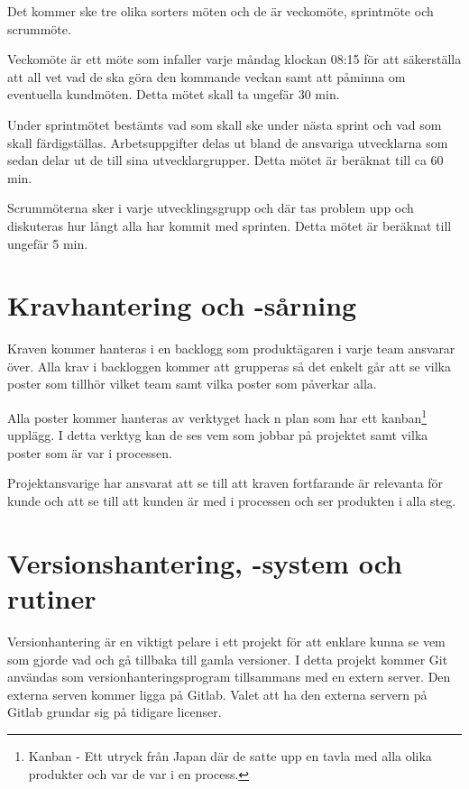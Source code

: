 \documentclass[a4paper,12pt,oneside,final]{extbook}
\begin{document}
Det kommer ske tre olika sorters möten och de är veckomöte, sprintmöte och scrummöte.  

Veckomöte är ett möte som infaller varje måndag klockan 08:15 för att säkerställa att all vet vad de ska göra den kommande veckan samt att påminna om eventuella kundmöten. Detta mötet skall ta ungefär 30 min.

Under sprintmötet bestämts vad som skall ske under nästa sprint och vad som skall färdigställas. Arbetsuppgifter delas ut bland de ansvariga utvecklarna som sedan delar ut de till sina utvecklargrupper. Detta mötet är beräknat till ca 60 min.

Scrummöterna sker i varje utvecklingsgrupp och där tas problem upp och diskuteras hur långt alla har kommit med sprinten.  Detta mötet är beräknat till ungefär 5 min.

\section{Kravhantering och -sårning}
Kraven kommer hanteras i en backlogg som produktägaren i varje team ansvarar över. Alla krav i backloggen kommer att grupperas så det enkelt går att se vilka poster som tillhör vilket team samt vilka poster som påverkar alla. 

Alla poster kommer hanteras av verktyget hack n plan som har ett kanban\footnote{Kanban - Ett utryck från Japan där de satte upp en tavla med alla olika produkter och var de var i en process.} upplägg. I detta verktyg kan de ses vem som jobbar på projektet samt vilka poster som är var i processen. 

Projektansvarige har ansvarat att se till att kraven fortfarande är relevanta för kunde och att se till att kunden är med i processen och ser produkten i alla steg.

\section{Versionshantering, -system och rutiner}
Versionhantering är en viktigt pelare i ett projekt för att enklare kunna se vem som gjorde vad och gå tillbaka till gamla versioner. I detta projekt kommer Git användas som versionhanteringsprogram tillsammans med en extern server. Den externa serven kommer ligga på Gitlab. Valet att ha den externa servern på Gitlab grundar sig på tidigare licenser.
\end{document}
